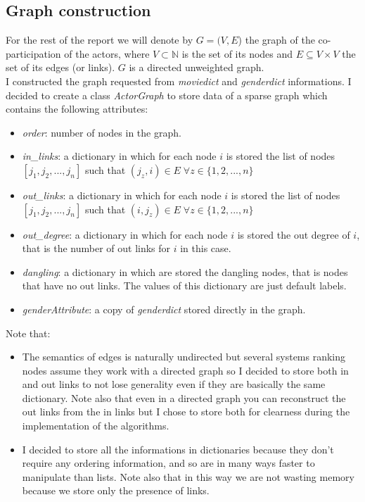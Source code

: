 \documentclass{article}
\begin{document}
\subsection{Graph construction}
\label{graph-construction}
For the rest of the report we will denote by $G = (V, E$) the graph of the co-participation of the actors, where $V \subset \mathbb{N}$ is the set of its nodes and $E \subseteq V\times V$ the set of its edges (or links). $G$ is a directed unweighted graph.\\
I constructed the graph requested from \textit{moviedict} and \textit{genderdict} informations. I decided to create a class \textit{ActorGraph} to store data of a sparse graph which contains the following attributes:
\begin{itemize}
    \item \textit{order}: number of nodes in the graph.
    \item \textit{in\_links}: a dictionary in which for each node $i$ is stored the list of nodes $[j_{1},j_{2}, ... , j_{n}]$  such that $(j_{z},i) \in E \; \forall z \in \{1,2,...,n\}$
    \item \textit{out\_links}: a dictionary in which for each node $i$ is stored the list of nodes $[j_{1},j_{2}, ... , j_{n}]$  such that $(i,j_{z}) \in E \; \forall z \in \{1,2,...,n\}$
    \item \textit{out\_degree}: a dictionary in which for each node $i$ is stored the out degree of $i$, that is the number of out links for $i$ in this case.
    \item \textit{dangling}: a dictionary in which are stored the dangling nodes, that is nodes that have no out links. The values of this dictionary are just default labels.
    \item \textit{genderAttribute}: a copy of \textit{genderdict} stored directly in the graph.
\end{itemize}
Note that:
\begin{itemize}
    \item The semantics of edges is naturally undirected but several systems ranking nodes assume they work with a directed graph so I decided to store both in and out links to not lose generality even if they are basically the same dictionary. Note also that even in a directed graph you can reconstruct the out links from the in links but I chose to store both for clearness during the implementation of the algorithms.
    \item I decided to store all the informations in dictionaries because they don’t require any ordering information, and so are in many ways faster to manipulate than lists. Note also that in this way we are not wasting memory because we store only the presence of links.
\end{itemize}
\end{document}
